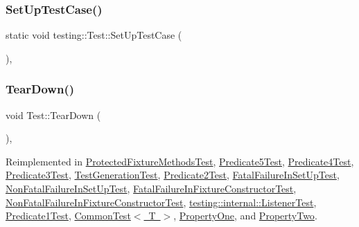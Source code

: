 \mbox{\label{classtesting_1_1Test_a5ccbac42fee8c5b00b0bfe89b6c49d79}} 
\subsubsection{\texorpdfstring{SetUpTestCase()}{SetUpTestCase()}}
{\footnotesize\ttfamily static void testing\+::\+Test\+::\+Set\+Up\+Test\+Case (\begin{DoxyParamCaption}{ }\end{DoxyParamCaption})\hspace{0.3cm}{\ttfamily [inline]}, {\ttfamily [static]}}

\mbox{\label{classtesting_1_1Test_a5f0ab439802cbe0ef7552f1a9f791923}} 
\subsubsection{\texorpdfstring{TearDown()}{TearDown()}}
{\footnotesize\ttfamily void Test\+::\+Tear\+Down (\begin{DoxyParamCaption}{ }\end{DoxyParamCaption})\hspace{0.3cm}{\ttfamily [protected]}, {\ttfamily [virtual]}}



Reimplemented in \mbox{\hyperlink{classProtectedFixtureMethodsTest_aa143dff0a99903cde207b6fd0042c03c}{Protected\+Fixture\+Methods\+Test}}, \mbox{\hyperlink{classPredicate5Test_ab7bc4521d96174d5ef96156edc15444d}{Predicate5\+Test}}, \mbox{\hyperlink{classPredicate4Test_ab61983a4cdf3657b02bc2b81b67729c4}{Predicate4\+Test}}, \mbox{\hyperlink{classPredicate3Test_aa4dc395bded849b6e5175566d791aba7}{Predicate3\+Test}}, \mbox{\hyperlink{classTestGenerationTest_a447190a74b306b4b94c25fed474d6029}{Test\+Generation\+Test}}, \mbox{\hyperlink{classPredicate2Test_a7379f8f7772af6b4c76edcc90b6aaaeb}{Predicate2\+Test}}, \mbox{\hyperlink{classFatalFailureInSetUpTest_a457707161063e08f7b6600ec5db449e4}{Fatal\+Failure\+In\+Set\+Up\+Test}}, \mbox{\hyperlink{classNonFatalFailureInSetUpTest_a36abc808b11afc6a9bfa20dac5c28c30}{Non\+Fatal\+Failure\+In\+Set\+Up\+Test}}, \mbox{\hyperlink{classFatalFailureInFixtureConstructorTest_a2763026a557e1fce4e59bd16c4eced57}{Fatal\+Failure\+In\+Fixture\+Constructor\+Test}}, \mbox{\hyperlink{classNonFatalFailureInFixtureConstructorTest_ab76d79c346d9a378d625fde5739e8ad6}{Non\+Fatal\+Failure\+In\+Fixture\+Constructor\+Test}}, \mbox{\hyperlink{classtesting_1_1internal_1_1ListenerTest_ad112535025d668e3ea14e71d8741c810}{testing\+::internal\+::\+Listener\+Test}}, \mbox{\hyperlink{classPredicate1Test_ad2974af5c6abc508847c3a9912b24a90}{Predicate1\+Test}}, \mbox{\hyperlink{classCommonTest_aeae195c2cefa956c6ae5be1226e6ecd8}{Common\+Test$<$ T $>$}}, \mbox{\hyperlink{classPropertyOne_a3ed895113848403d5ea27f52a1bb0545}{Property\+One}}, and \mbox{\hyperlink{classPropertyTwo_aa4ffb2b9dddeba69f0f9baf133f06ef2}{Property\+Two}}.


